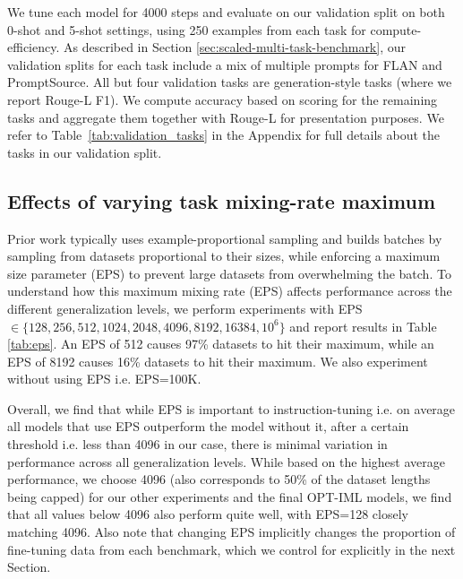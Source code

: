 We tune each model for 4000 steps and evaluate on our validation split on both 0-shot and 5-shot settings, using 250 examples from each task for compute-efficiency. As described in Section \ref{sec:scaled-multi-task-benchmark}, our validation splits for each task include a mix of multiple prompts for FLAN and PromptSource. All but four validation tasks are generation-style tasks (where we report Rouge-L F1). We compute accuracy based on scoring for the remaining tasks and aggregate them together with Rouge-L for presentation purposes. We refer to Table~\ref{tab:validation_tasks} in the Appendix for full details about the tasks in our validation split. 

\subsection{Effects of varying task mixing-rate maximum}
\label{subsec:eps}

Prior work \citep{raffel2020t5,wei2021flan} typically uses example-proportional sampling and builds batches by sampling from datasets proportional to their sizes, while enforcing a maximum size parameter (EPS) to prevent large datasets from overwhelming the batch. To understand how this maximum mixing rate (EPS) affects performance across the different generalization levels, we perform experiments with EPS $\in \{128, 256, 512, 1024, 2048, 4096, 8192, 16384, 10^6\}$ and report results in Table \ref{tab:eps}. An EPS of 512 causes 97\% datasets to hit their maximum, while an EPS of 8192 causes 16\% datasets to hit their maximum. We also experiment without using EPS i.e. EPS=100K. 

Overall, we find that while EPS is important to instruction-tuning i.e. on average all models that use EPS outperform the model without it, after a certain threshold i.e. less than 4096 in our case, there is minimal variation in performance across all generalization levels. While based on the highest average performance, we choose 4096 (also corresponds to 50\% of the dataset lengths being capped) for our other experiments and the final OPT-IML models, we find that all values below 4096 also perform quite well, with EPS=128 closely matching 4096. Also note that changing EPS implicitly changes the proportion of fine-tuning data from each benchmark, which we control for explicitly in the next Section.

